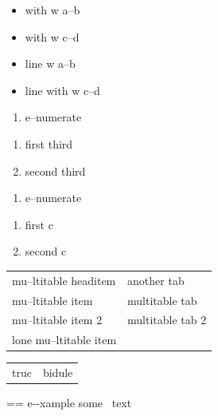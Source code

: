 \documentclass{book}
\makeatletter
\newenvironment{Texinfopreformatted}{%
  \par\GNUTobeylines\obeyspaces\frenchspacing\parskip=\z@\parindent=\z@}{}
{\catcode`\^^M=13 \gdef\GNUTobeylines{\catcode`\^^M=13 \def^^M{\null\par}}}
\newenvironment{Texinfoindented}{\begin{list}{}{}\item\relax}{\end{list}}
\renewcommand{\_}{\Texinfounderscore\discretionary{}{}{}}
\makeatother
\begin{document}
\begin{itemize}[label={}]
\item with w a--b
\item with w c--d
\end{itemize}

\begin{itemize}[label=\hbox{} on a line]
\item line w a--b
\item line with w c--d
\end{itemize}

\begin{enumerate}[start=1]
\item e--numerate
\end{enumerate}

\begin{enumerate}[start=3]
\item first third
\item second third
\end{enumerate}

\begin{enumerate}[label=\alph*.]
\item e--numerate
\end{enumerate}

\begin{enumerate}[label=\alph*.,start=3]
\item first c
\item second c
\end{enumerate}

\begin{tabular}{m{} m{}}%
mu--ltitable headitem &another tab\\
mu--ltitable item &multitable tab\\
mu--ltitable item 2 &multitable tab 2
\index[cp]{index entry within multitable@index entry within multitable}%
\\
lone mu--ltitable item&\\
\end{tabular}%

\begin{tabular}{m{} m{}}%
truc &bidule\\
\end{tabular}%

\begin{Texinfoindented}
\begin{Texinfopreformatted}%
\ttfamily e{-}{-}xample  some
\   text
\end{Texinfopreformatted}
\end{Texinfoindented}
\end{document}
